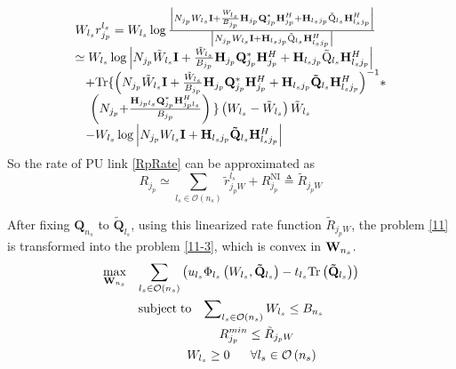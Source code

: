 \documentclass[12pt,onecolumn,tworows]{IEEEtran}
\begin{document}
 \begin{equation}\label{4}
\begin{array}{l}
{W_{{l_s}}}r_{{j_p}}^{{l_s}}
 = {W_{{l_s}}}\log \frac{{\left| {{N_{{j_p}}}{W_{{l_s}}}{\bf{I}} + \frac{{{W_{{l_s}}}}}{{{B_{{j_p}}}}}{{\bf{H}}_{{j_p}}}{\bf{Q}}_{{j_p}}^*{\bf{H}}_{{j_p}}^H + {{\bf{H}}_{{l_s}{j_p}}}{{{\rm{\tilde Q}}}_{{l_s}}}{\bf{H}}_{{l_s}{j_p}}^H} \right|}}{{\left| {{N_{{j_p}}}{W_{{l_s}}}{\bf{I}} + {{\bf{H}}_{{l_s}{j_p}}}{{{\rm{\tilde Q}}}_{{l_s}}}{\bf{H}}_{{l_s}{j_p}}^H} \right|}}\\
 \simeq {W_{{l_s}}}\log \left| {{N_{{j_p}}}{{\tilde W}_{{l_s}}}{\bf{I}} + \frac{{{{\tilde W}_{{l_s}}}}}{{{B_{{j_p}}}}}{{\bf{H}}_{{j_p}}}{\bf{Q}}_{{j_p}}^*{\bf{H}}_{{j_p}}^H + {{\bf{H}}_{{l_s}{j_p}}}{{{\rm{\tilde Q}}}_{{l_s}}}{\bf{H}}_{{l_s}{j_p}}^H} \right|\\
\;\;\; + {\rm{Tr\{ }}{\left( {{N_{{j_p}}}{{\tilde W}_{{l_s}}}{\bf{I}} + \frac{{{{\tilde W}_{{l_s}}}}}{{{B_{{j_p}}}}}{{\bf{H}}_{{j_p}}}{\bf{Q}}_{{j_p}}^*{\bf{H}}_{{j_p}}^H + {{\bf{H}}_{{l_s}{j_p}}}{{{\bf{\tilde Q}}}_{{l_s}}}{\bf{H}}_{{l_s}{j_p}}^H} \right)^{ - 1}}*\\
{\kern 1pt} {\kern 1pt} \;\;\;\left( {{N_{{j_p}}}{\rm{ + }}\frac{{{{\bf{H}}_{{j_p}{l_s}}}{\bf{Q}}_{{j_p}}^*{\bf{H}}_{{j_p}{l_s}}^H}}{{{B_{{j_p}}}}}} \right){\rm{\} }}\left( {{W_{{l_s}}} - {{\tilde W}_{{l_s}}}} \right){{\tilde W}_{{l_s}}}\\
\;\;\; - {W_{{l_s}}}\log \left| {{N_{{j_p}}}{W_{{l_s}}}{\bf{I}} + {{\bf{H}}_{{l_s}{j_p}}}{{{\bf{\tilde Q}}}_{{l_s}}}{\bf{H}}_{{l_s}{j_p}}^H} \right|\;\;\;
\end{array}
\end{equation}
So the rate of PU link \eqref{RpRate} can be approximated as
\begin{equation}\label{LinearizedRate}
R_{j_p}\simeq \sum \limits_{l_s \in \mathcal{O}(n_s)}\tilde{r}_{j_pW}^{l_s}+R_{j_p}^{\text{NI}}\triangleq \tilde{R}_{j_pW}
\end{equation}

After fixing $\mathbf{Q}_{n_s}$ to ${{{\mathbf{\tilde Q}}}_{{l_s}}}$, using this linearized rate function ${{\tilde R}_{{j_pW}}}$, the problem \eqref{11} is transformed into
the problem \eqref{11-3}, which is convex in ${\bf{W}}_{{n_s}}$.
\begin{equation}\label{11-3}
\begin{gathered}
{\max _{{{\bf{W}}_{{n_s}}}}}\;\;\;\sum\limits_{{l_s} \in {\cal O}\left( {{n_s}} \right)} {\left( {{u_{{l_s}}}{\Phi _{{l_s}}}\left( {{{{{W}}}_{{l_s}}},{{{\mathbf{\tilde Q}}}_{{l_s}}}} \right) - {t_{{l_s}}}{\rm{Tr}}\left( {{{\mathbf{\tilde Q}}_{{l_s}}}} \right)} \right)} \\
{\rm{subject}}\;{\rm{to}}\;\;\;\sum\nolimits_{{l_s} \in {\cal O}\left( {{n_s}} \right)} {{W_{{l_s}}} \le {B_{{n_s}}}} \\
\;\;\;\;\;\;\;\;\;\;\;\;\;\;\;R_{{j_p}}^{min} \le {{ \tilde{R}}_{{j_pW}}}\\
\;\;\;\;\;\;\;\;\;\;\;\;\;\;\;{W_{{l_s}}} \ge 0\;\;\;\;\;\;\forall {l_s} \in {\cal O}\left( {{n_s}} \right)\;\;\;
\end{gathered}
\end{equation}
\end{document}
